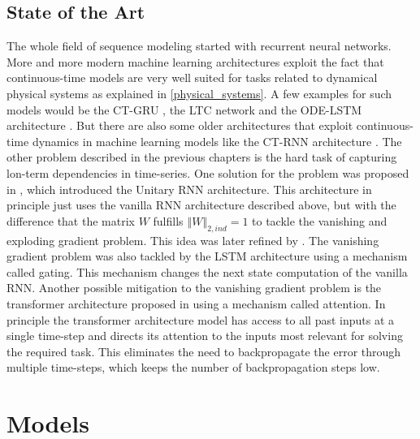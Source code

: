 \documentclass[draft,final]{vutinfth} %
\begin{document}
    \section{State of the Art}
    The whole field of sequence modeling started with recurrent neural networks.
    More and more modern machine learning architectures exploit the fact that continuous-time models are very well suited for tasks related to dynamical physical systems as explained in \ref{physical_systems}.
    A few examples for such models would be the CT-GRU \cite{CTGRU}, the LTC network \cite{LTCNetworks} and the ODE-LSTM architecture \cite{ODELSTM}.
    But there are also some older architectures that exploit continuous-time dynamics in machine learning models like the CT-RNN architecture \cite{CTRNN}.
    The other problem described in the previous chapters is the hard task of capturing lon-term dependencies in time-series.
    One solution for the problem was proposed in \cite{UnitaryRNNs}, which introduced the Unitary RNN architecture.
    This architecture in principle just uses the vanilla RNN architecture described above, but with the difference that the matrix $W$ fulfills $\left\Vert W \right\Vert_{2,ind} = 1$ to tackle the vanishing and exploding gradient problem.
    This idea was later refined by \cite{EfficientUnitaryRNNs}.
    The vanishing gradient problem was also tackled by the LSTM architecture \cite{LSTM} using a mechanism called gating. 
    This mechanism changes the next state computation of the vanilla RNN.
    Another possible mitigation to the vanishing gradient problem is the transformer architecture proposed in \cite{Transformer} using a mechanism called attention.
    In principle the transformer architecture model has access to all past inputs at a single time-step and directs its attention to the inputs most relevant for solving the required task.
    This eliminates the need to backpropagate the error through multiple time-steps, which keeps the number of backpropagation steps low. 
    

    \chapter{Models}
\end{document}
